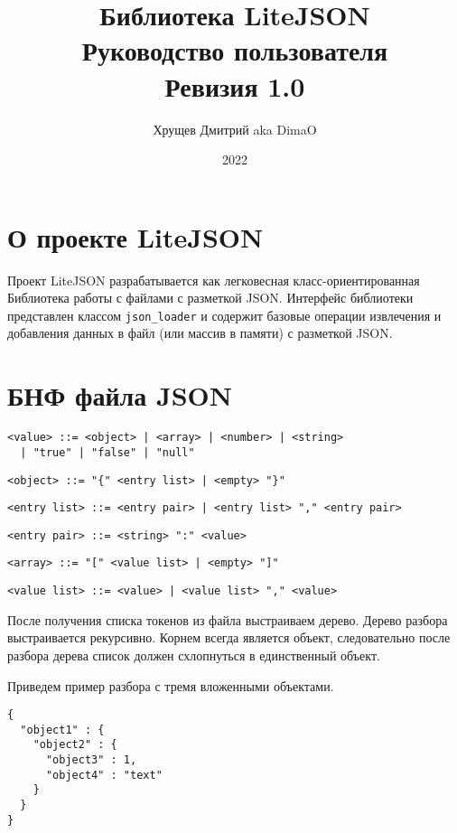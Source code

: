 \documentclass[a4paper, a4paper]{article}
\title{Библиотека LiteJSON \\ Руководство пользователя \\ Ревизия 1.0}
\author{Хрущев Дмитрий aka DimaO}
\date{2022}
\begin{document}
\maketitle
\newpage
\tableofcontents
\newpage

\section{О проекте LiteJSON}
Проект LiteJSON разрабатывается как легковесная класс-ориентированная Библиотека
работы с файлами с разметкой JSON. Интерфейс библиотеки представлен классом
\texttt{json\_loader} и содержит базовые операции извлечения и добавления данных в файл
(или массив в памяти) с разметкой JSON.

\section{БНФ файла JSON}

\begin{verbatim}
<value> ::= <object> | <array> | <number> | <string>
  | "true" | "false" | "null"
\end{verbatim}

\begin{verbatim}
<object> ::= "{" <entry list> | <empty> "}"
\end{verbatim}

\begin{verbatim}
<entry list> ::= <entry pair> | <entry list> "," <entry pair>
\end{verbatim}

\begin{verbatim}
<entry pair> ::= <string> ":" <value>
\end{verbatim}

\begin{verbatim}
<array> ::= "[" <value list> | <empty> "]"
\end{verbatim}

\begin{verbatim}
<value list> ::= <value> | <value list> "," <value>
\end{verbatim}

После получения списка токенов из файла выстраиваем дерево. Дерево разбора
выстраивается рекурсивно. Корнем всегда является объект, следовательно после
разбора дерева список должен схлопнуться в единственный объект.

Приведем пример разбора с тремя вложенными объектами.

\begin{verbatim}
{
  "object1" : {
    "object2" : {
      "object3" : 1,
      "object4" : "text"
    }
  }
}
\end{verbatim}
\end{document}
